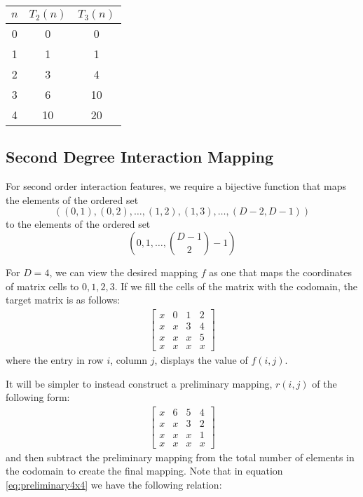 \documentclass{article}
\begin{document}
\begin{tabular}{| c | c | c |}
  \hline
  $n$ & $T_2(n)$ & $T_3(n)$ \\
  \hline
  0 & 0 & 0 \\
  1 & 1 & 1 \\
  2 & 3 & 4 \\
  3 & 6 & 10 \\
  4 & 10 & 20 \\
  \hline  
\end{tabular}

\subsection{Second Degree Interaction Mapping}
For second order interaction features, we require a bijective function that maps the elements of the ordered set
\begin{equation}
((0, 1), (0, 2), \dots, (1, 2), (1, 3), \dots, (D-2, D-1))
\end{equation}
to the elements of the ordered set
\begin{equation}
(0,1,\dots,\binom{D-1}{2}-1)
\end{equation}

For $D=4$, we can view the desired mapping $f$ as one that maps the coordinates of matrix cells to $0, 1, 2, 3$.
If we fill the cells of the matrix with the codomain, the target matrix is as follows:
\begin{align}
\begin{bmatrix}
x & 0 & 1 & 2 \\
x & x & 3 & 4 \\
x & x & x & 5 \\
x & x & x & x
\end{bmatrix}
\label{eq:4x4mat}
\end{align}
where the entry in row $i$, column $j$, displays the value of $f(i, j)$.

It will be simpler to instead construct a preliminary mapping, $r(i, j)$ of the following form:
\begin{align}
\begin{bmatrix}
x & 6 & 5 & 4 \\
x & x & 3 & 2 \\
x & x & x & 1 \\
x & x & x & x
\end{bmatrix}
\label{eq:preliminary4x4}
\end{align}
and then subtract the preliminary mapping from the total number of elements in the codomain to create the final mapping.
Note that in equation \ref{eq:preliminary4x4} we have the following relation:
\end{document}
